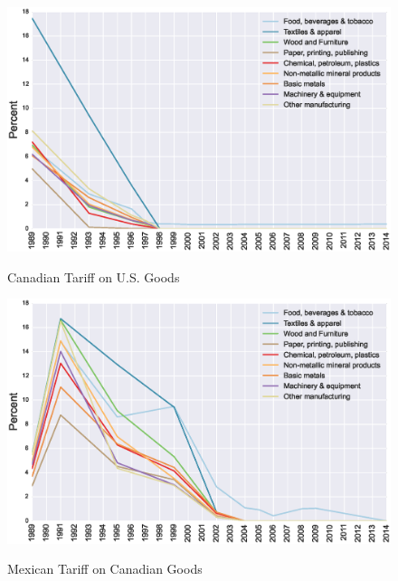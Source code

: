 \begin{figure}[htpb]\centering
\caption{Canadian Tariff on U.S. Goods}\vspace{0.2cm}
\includegraphics[scale=0.5]{tau_can_usa}
\label{fig:can_usa}
\end{figure}

\newpage

\begin{figure}[htpb]\centering
\caption{\small Mexican Tariff on Canadian Goods}\vspace{0.2cm}
\includegraphics[scale=0.5]{tau_mex_can}
\label{fig:mex_can}
\end{figure}


